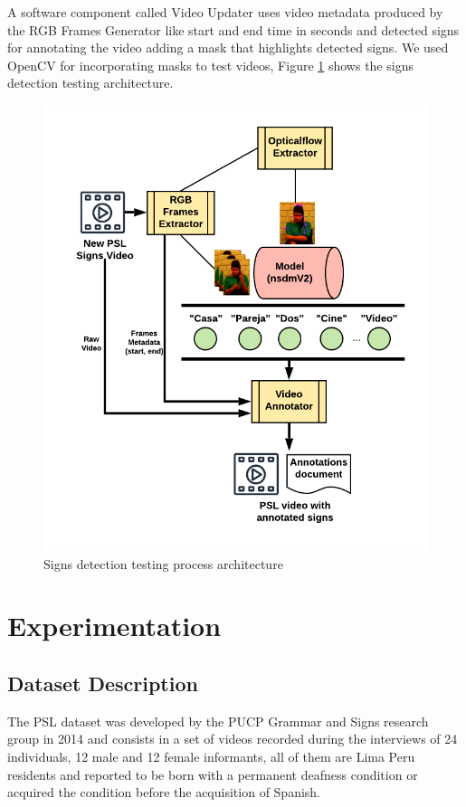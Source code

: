 \documentclass[twocolumn,conference]{article}
\begin{document}
A software component called Video Updater uses video metadata produced by the RGB Frames Generator like start and end time in seconds and detected signs for annotating the video adding a mask that highlights detected signs. We used OpenCV for incorporating masks to test videos, Figure \ref{fig:video-testing-architecture} shows the signs detection testing architecture.
\begin{figure}[hbt!]
\includegraphics[width=\linewidth]{images/new-video-test-architecture.png}
\caption{Signs detection testing process architecture}
\label{fig:video-testing-architecture}
\end{figure}

\section{Experimentation}\label{experimentation}
\subsection{Dataset Description \cite{lsp_dataset}}\label{datasetdesc}
The PSL dataset was developed by the PUCP Grammar and Signs research group in 2014 and consists in a set of videos recorded during the interviews of 24 individuals, 12 male and 12 female informants, all of them are Lima Peru residents and reported to be born with a permanent deafness condition or acquired the condition before the acquisition of Spanish. 
\end{document}
